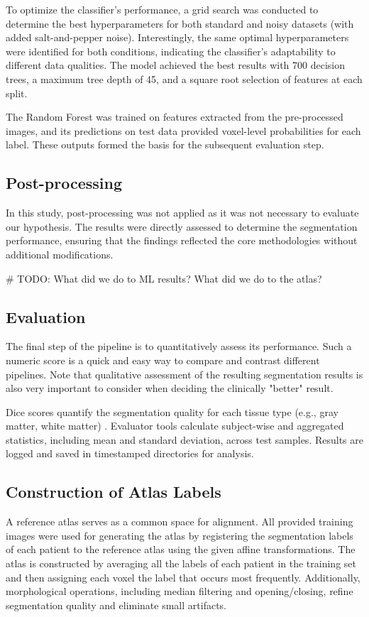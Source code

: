 To optimize the classifier’s performance, a grid search was conducted to determine the best hyperparameters for both standard and noisy datasets (with added salt-and-pepper noise). Interestingly, the same optimal hyperparameters were identified for both conditions, indicating the classifier’s adaptability to different data qualities. The model achieved the best results with 700 decision trees, a maximum tree depth of 45, and a square root selection of features at each split.

The Random Forest was trained on features extracted from the pre-processed images, and its predictions on test data provided voxel-level probabilities for each label. These outputs formed the basis for the subsequent evaluation step.


\subsection{Post-processing}

In this study, post-processing was not applied as it was not necessary to evaluate our hypothesis. The results were directly assessed to determine the segmentation performance, ensuring that the findings reflected the core methodologies without additional modifications.

\# TODO: What did we do to ML results? What did we do to the atlas?

\subsection{Evaluation}

The final step of the pipeline is to quantitatively assess its performance. Such a numeric score is a quick and easy way to compare and contrast different pipelines. Note that qualitative assessment of the resulting segmentation results is also very important to consider when deciding the clinically "better" result.

Dice scores quantify the segmentation quality for each tissue type (e.g., gray matter, white matter) \cite{b12}. Evaluator tools calculate subject-wise and aggregated statistics, including mean and standard deviation, across test samples. Results are logged and saved in timestamped directories for analysis.

\subsection{Construction of Atlas Labels}
A reference atlas serves as a common space for alignment. All provided training images were used for generating the atlas by registering the segmentation labels of each patient to the reference atlas using the given affine transformations.  The atlas is constructed by averaging all the labels of each patient in the training set and then assigning each voxel the label that occurs most frequently. Additionally, morphological operations, including median filtering and opening/closing, refine segmentation quality and eliminate small artifacts.




